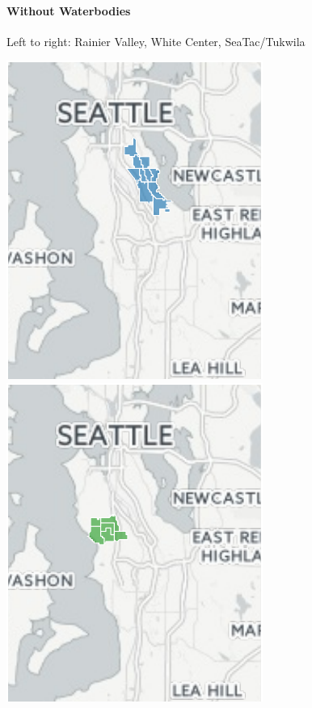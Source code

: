 \documentclass[]{article}
\let\oldparagraph\paragraph
\renewcommand{\paragraph}[1]{\oldparagraph{#1}\mbox{}}
\begin{document}
\paragraph{Without Waterbodies}\label{without-waterbodies}

Left to right: Rainier Valley, White Center, SeaTac/Tukwila

\includegraphics{tracts_files/figure-latex/unnamed-chunk-3-1.pdf}
\includegraphics{tracts_files/figure-latex/unnamed-chunk-3-2.pdf}
\end{document}
